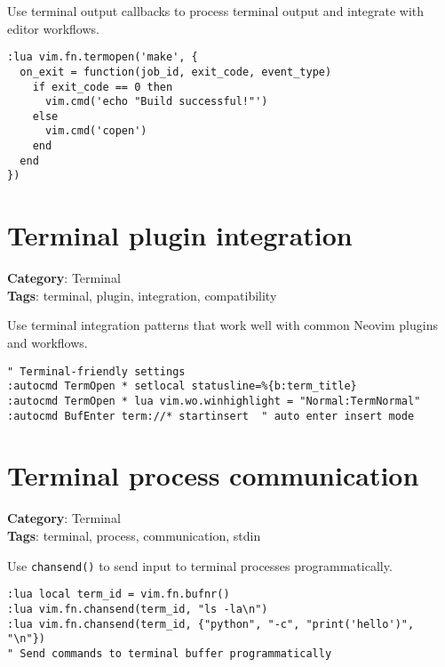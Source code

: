 {{{{{{{{{Use terminal output callbacks to process terminal output and integrate with editor workflows.

\begin{Exa*}{}
\begin{Verbatim}[fontsize=\footnotesize, breaklines, breakanywhere]
:lua vim.fn.termopen('make', {
  on_exit = function(job_id, exit_code, event_type)
    if exit_code == 0 then 
      vim.cmd('echo "Build successful!"')
    else
      vim.cmd('copen')
    end
  end
})
\end{Verbatim}
\end{Exa*}

\section{Terminal plugin integration}

\textbf{Category}: Terminal\\ \textbf{Tags}: terminal, plugin, integration, compatibility
\vspace{0.5cm}

Use terminal integration patterns that work well with common Neovim plugins and workflows.

\begin{Exa*}{}
\begin{Verbatim}[fontsize=\footnotesize, breaklines, breakanywhere]
" Terminal-friendly settings
:autocmd TermOpen * setlocal statusline=%{b:term_title}
:autocmd TermOpen * lua vim.wo.winhighlight = "Normal:TermNormal"
:autocmd BufEnter term://* startinsert  " auto enter insert mode
\end{Verbatim}
\end{Exa*}

\section{Terminal process communication}

\textbf{Category}: Terminal\\ \textbf{Tags}: terminal, process, communication, stdin
\vspace{0.5cm}

Use {\footnotesize \Verb§chansend()§} to send input to terminal processes programmatically.

\begin{Exa*}{}
\begin{Verbatim}[fontsize=\footnotesize, breaklines, breakanywhere]
:lua local term_id = vim.fn.bufnr()
:lua vim.fn.chansend(term_id, "ls -la\n")
:lua vim.fn.chansend(term_id, {"python", "-c", "print('hello')", "\n"})
" Send commands to terminal buffer programmatically
\end{Verbatim}
\end{Exa*}

}}}}}}}}}
